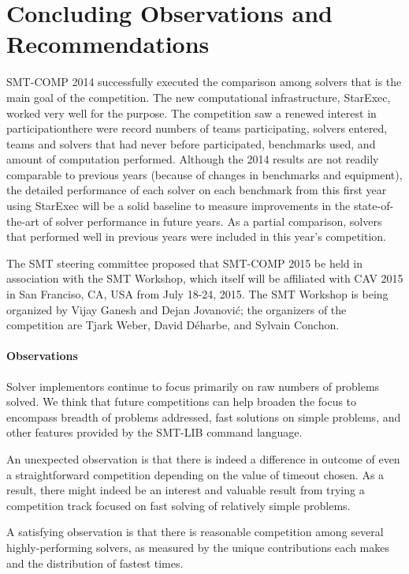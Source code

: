 \documentclass[twoside,11pt]{article}
\begin{document}
\section{Concluding Observations and Recommendations}
\label{sec:conclusions}

SMT-COMP 2014 successfully executed the comparison among solvers that is the main goal of the competition. The new computational infrastructure, StarExec, worked very well for the purpose. The competition saw a renewed interest in participation\textemdash there were record numbers of teams participating, solvers entered, teams and solvers that had never before participated, benchmarks used, and amount of computation performed. Although the 2014 results are not readily comparable to previous years (because of changes in benchmarks and equipment), the detailed performance of each solver on each benchmark from this first year using StarExec will be a solid baseline to measure improvements in the state-of-the-art of solver performance in future years. As a partial comparison, solvers that performed well in previous years were included in this year's competition.

The SMT steering committee proposed that SMT-COMP 2015 be held in association with the SMT Workshop, which itself will be affiliated with CAV 2015 in San Franciso, CA, USA from July 18-24, 2015.  The SMT Workshop is being organized by Vijay Ganesh and Dejan Jovanovi\'c; the organizers of the competition are Tjark Weber, David D\'eharbe, and Sylvain Conchon.

\paragraph{Observations}

Solver implementors continue to focus primarily on raw numbers of problems solved. We think that future competitions can 
help broaden the focus to encompass breadth of problems addressed, fast solutions on simple problems, and other features provided by the SMT-LIB command language.

An unexpected observation is that there is indeed a difference in outcome of even a straightforward competition depending on the value of timeout chosen. As a result, there might indeed be an interest and valuable result from trying a competition track focused on fast solving of relatively simple problems.

A satisfying observation is that there is reasonable competition among several highly-performing solvers, as measured by the unique contributions each makes and the distribution of fastest times.
\end{document}
